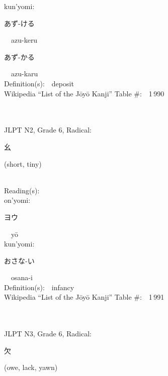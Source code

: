 \begin{multicols}{2}
{\hspace*{1em}}kun'yomi:\ \ \\
{\hspace*{2em}}{\begin{CJK}{UTF8}{min} あず-ける \end{CJK}}\ \ azu-keru\ \ \\
{\hspace*{2em}}{\begin{CJK}{UTF8}{min} あず-かる \end{CJK}}\ \ azu-karu\ \ \\
Definition(s):\ \ deposit \\
Wikipedia ``List of the J\=oy\=o Kanji'' Table \#:\ \ 1\,990 \\
\ \ \\
{\fontsize{34pt}{40pt}  }\ \ \\  %
{JLPT N2, Grade 6, Radical:\ \ {\begin{CJK}{UTF8}{min} 幺 \end{CJK}} (short, tiny) } \\
Reading(s):\ \ \\
{\hspace*{1em}}on'yomi:\ \ \\
{\hspace*{2em}}{\begin{CJK}{UTF8}{min} ヨウ \end{CJK}}\ \ y\=o\ \ \\
{\hspace*{1em}}kun'yomi:\ \ \\
{\hspace*{2em}}{\begin{CJK}{UTF8}{min} おさな-い \end{CJK}}\ \ osana-i\ \ \\
Definition(s):\ \ infancy \\
Wikipedia ``List of the J\=oy\=o Kanji'' Table \#:\ \ 1\,991 \\
\ \ \\
{\fontsize{34pt}{40pt}  }\ \ \\  %
{JLPT N3, Grade 6, Radical:\ \ {\begin{CJK}{UTF8}{min} 欠 \end{CJK}} (owe, lack, yawn) } \\

\end{multicols}
